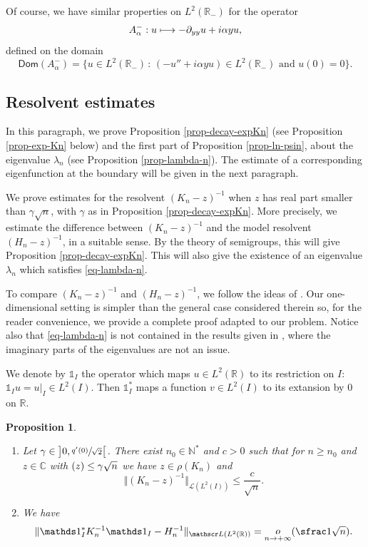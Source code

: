 \documentclass[JEP,XML,SOM,Unicode]{cedram}
\let\mathcal\mathscr
\def\mto{\mathchoice{\longmapsto}{\mapsto}{\mapsto}{\mapsto}}
\theoremstyle{plain}
\newtheorem{proposition}[theorem]{Proposition}
\theoremstyle{definition}
\newcommand{\nr}[1]{\Vert #1\Vert}
\newcommand{\bset}[1]{\bigl\{ #1\bigr\}}
\newcommand{\inv}{^{-1}}
\newcommand{\littleo}[2]{\mathop{o}\limits_{#1 \to #2}}
\newcommand{\1}{\mathds 1}
\newcommand{\st}{\,:\,}
\let\Re\relax
\DeclareMathOperator{\Re}{\mathsf{Re}\mkern2mu}
\newcommand{\Dom}{\mathsf{Dom}}
\newcommand{\R}{\mathbb{R}}
\def\C{\mathbb{C}}
\newcommand{\N}{\mathbb{N}}
\let\a\alpha
\let\l\lambda
\newcommand{\Lc}{{\mathcal L}}
\begin{document}
Of course, we have similar properties on $L^2(\R_-)$ for the operator
\[
A_\a^- : u \mto -\partial_{yy} u + i \a y u,
\]
defined on the domain
\[
\Dom(A_\a^-) = \bset{u \in L^2(\R_-) \st (-u'' + i \a y u) \in L^2(\R_-) \text{ and } u(0) = 0}.
\]

\subsection{Resolvent estimates}\label{sec-Henry}

In this paragraph, we prove Proposition \ref{prop-decay-expKn} (see Proposition \ref{prop-exp-Kn} below) and the first part of Proposition \ref{prop-ln-psin}, about the eigenvalue $\l_n$ (see Proposition \ref{prop-lambda-n}). The estimate of a corresponding eigenfunction at the boundary will be given in the next paragraph.

We prove estimates for the resolvent $(K_n-z)\inv$ when $z$ has real part smaller than $\gamma \sqrt n$, with $\gamma$ as in Proposition \ref{prop-decay-expKn}. More precisely, we estimate the difference between $(K_n-z)\inv$ and the model resolvent $(H_n-z)\inv$, in a suitable sense. By the theory of semigroups, this will give Proposition \ref{prop-decay-expKn}. This will also give the existence of an eigenvalue $\l_n$ which satisfies \eqref{eq-lambda-n}.

To compare $(K_n-z)\inv$ and $(H_n-z)\inv$, we follow the ideas of \cite{henry}. Our one-dimensional setting is simpler than the general case considered therein so, for the reader convenience, we provide a complete proof adapted to our problem. Notice also that \eqref{eq-lambda-n} is not contained in the results given in \cite{henry}, where the imaginary parts of the eigenvalues are not an issue.

We denote by $\1_I$ the operator which maps $u \in L^2(\R)$ to its restriction on $I$: $\1_I u = u|_{I} \in L^2(I)$. Then $\1_I^*$ maps a function $v \in L^2(I)$ to its extansion by 0 on $\R$.

\skpt
\begin{proposition}
\begin{enumerate}
\item Let $\gamma \in \big]0,\sfrac {q'(0)}{\sqrt 2}\big[$. There exist $n_0 \in \N^*$ and $c > 0$ such that for $n \geq n_0$ and $z \in \C$ with $\Re(z) \leq \gamma \sqrt n$ we have $z \in \rho(K_n)$ and
\[
\nr{(K_n-z)\inv}_{\Lc(L^2(I))} \leq \frac {c}{\sqrt n}.
\]
\item We have
\[
\nr{\1_I^* K_n\inv \1_I - H_n\inv }_{\Lc(L^2(\R))} = \littleo n {+\infty}(\sfrac 1 {\sqrt n}).
\]
\end{enumerate}
\label{prop-spectre-Kn}
\end{proposition}
\end{document}
